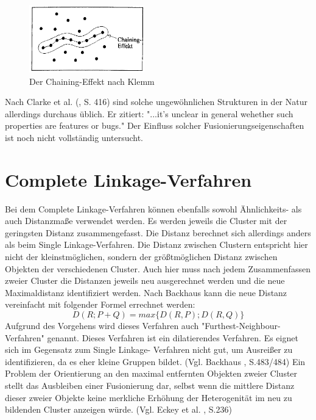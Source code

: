 \begin{figure}[h]
	\begin{center}
		\includegraphics[width=5cm]{pics/klemm19.png}
	\end{center}
	\caption{Der Chaining-Effekt nach Klemm}
	\label{pic:klemm19}
\end{figure}

Nach Clarke et al. (\cite{Clarke.2009}, S. 416) sind solche ungewöhnlichen Strukturen in der Natur allerdings durchaus üblich. Er zitiert: "...it's unclear in general wehether such properties are features or bugs." Der Einfluss solcher Fusionierungseigenschaften ist noch nicht vollständig untersucht.

\section{Complete Linkage-Verfahren}
Bei dem Complete Linkage-Verfahren können ebenfalls sowohl Ähnlichkeits- als auch Distanzmaße verwendet werden. Es werden jeweils die Cluster mit der geringsten Distanz zusammengefasst. Die Distanz berechnet sich allerdings anders als beim Single Linkage-Verfahren. Die Distanz zwischen Clustern entspricht hier nicht der kleinstmöglichen, sondern der größtmöglichen Distanz zwischen Objekten der verschiedenen Cluster. Auch hier muss nach jedem Zusammenfassen zweier Cluster die Distanzen jeweils neu ausgerechnet werden und die neue Maximaldistanz identifiziert werden.
Nach Backhaus \cite{Backhaus.2016} kann die neue Distanz vereinfacht mit folgender Formel errechnet werden:                                                                                                                                                                                                                                                                                                                                                               
\begin{equation}
	D(R;P+Q) = max\{D(R,P);D(R,Q)\}
\end{equation}
Aufgrund des Vorgehens wird dieses Verfahren auch "Furthest-Neighbour-Verfahren" genannt.
Dieses Verfahren ist ein dilatierendes Verfahren. Es eignet sich im Gegensatz zum Single Linkage- Verfahren nicht gut, um Ausreißer zu identifizieren, da es eher kleine Gruppen bildet. (Vgl. Backhaus \cite{Backhaus.2016}, S.483/484) Ein Problem der Orientierung an den maximal entfernten Objekten zweier Cluster stellt das Ausbleiben einer Fusionierung dar, selbst wenn die mittlere Distanz dieser zweier Objekte keine merkliche Erhöhung der Heterogenität im neu zu bildenden Cluster anzeigen würde. (Vgl. Eckey et al. \cite{Eckey.2002}, S.236)

